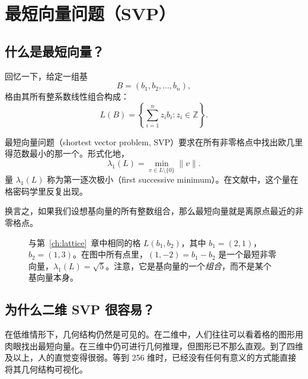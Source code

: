 \chapter{最短向量问题（SVP）}
\label{ch:svp}

\section{什么是最短向量？}

回忆一下，给定一组基
\[
B=(b_1,b_2,\dots,b_n),
\]
格由其所有整系数线性组合构成：
\[
L(B)=\left\{\sum_{i=1}^n z_i b_i : z_i\in\mathbb{Z}\right\}.
\]

最短向量问题（shortest vector problem, SVP）要求在所有非零格点中找出欧几里得范数最小的那一个。形式化地，
\[
\lambda_1(L)=\min_{v\in L\setminus\{0\}} \|v\|.
\]
量 $\lambda_1(L)$ 称为第一逐次极小（first successive minimum）。在文献中，这个量在格密码学里反复出现。

换言之，如果我们设想基向量的所有整数组合，那么最短向量就是离原点最近的非零格点。

\begin{figure}[H]
\centering
{}
\caption{与第~\ref{ch:lattice}~章中相同的格 $L(b_1,b_2)$，其中 $b_1=(2,1)$，$b_2=(1,3)$。在图中所有点里，$(1,-2)=b_1-b_2$ 是一个最短非零向量，$\lambda_1(L)=\sqrt{5}$。注意，它是基向量的一个\emph{组合}，而不是某个基向量本身。}
\label{fig:svp}
\end{figure}

\section{为什么二维 SVP 很容易？}

在低维情形下，几何结构仍然是可见的。在二维中，人们往往可以看着格的图形用肉眼找出最短向量。在三维中仍可进行几何推理，但图形已不那么直观。到了四维及以上，人的直觉变得很弱。等到 256 维时，已经没有任何有意义的方式能直接将其几何结构可视化。

